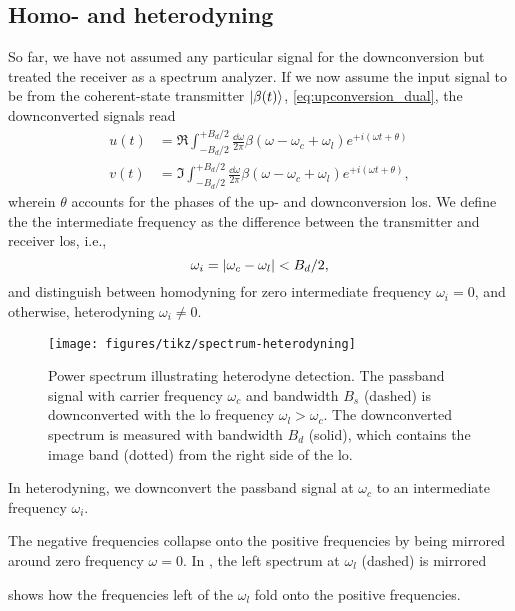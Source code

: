 \subsection{Homo- and heterodyning}

So far, we have not assumed any particular signal for the downconversion but treated the receiver as a spectrum analyzer.
If we now assume the input signal to be from the coherent-state transmitter $\lvert\beta(t)\rangle$, \cref{eq:upconversion_dual}, the downconverted signals read
\begin{align}
	u(t)
	&=
	\Re
	\int_{-B_d/2}^{+B_d/2}\frac{\dd{\omega}}{2\pi}
	\beta(\omega-\omega_c+\omega_l)
	e^{+i(\omega t+\theta)}
	\label{eq:receiver_demod_real}
	\\
	v(t)
	&=
	\Im
	\int_{-B_d/2}^{+B_d/2}\frac{\dd{\omega}}{2\pi}
	\beta(\omega-\omega_c+\omega_l)
	e^{+i(\omega t+\theta)}
	\label{eq:receiver_demod_imag}
	,
\end{align}
wherein $\theta$ accounts for the phases of the up- and downconversion \glspl{lo}.
We define the the intermediate frequency as the difference between the transmitter and receiver \glspl{lo}, i.e.,
\begin{equation}
	\omega_i
	=
	\lvert\omega_c-\omega_l\rvert
	<
	B_d/2
	,
\end{equation}
and distinguish between homodyning for zero intermediate frequency $\omega_i=0$, and otherwise, heterodyning $\omega_i\neq 0$.
\begin{figure}[htb]
	\centering
	\texttt{[image: figures/tikz/spectrum-heterodyning]}
	\caption{Power spectrum illustrating heterodyne detection. The passband signal with carrier frequency $\omega_c$ and bandwidth $B_s$ (dashed) is downconverted with the \gls{lo} frequency $\omega_l>\omega_c$. The downconverted spectrum is measured with bandwidth $B_d$ (solid), which contains the image band (dotted) from the right side of the \gls{lo}.}\label{fig:spectrum_heterodyning}
\end{figure}
In heterodyning, we downconvert the passband signal at $\omega_c$ to an intermediate frequency $\omega_i$.


The negative frequencies collapse onto the positive frequencies by being mirrored around zero frequency $\omega=0$.
In , the left spectrum at $\omega_l$ (dashed) is mirrored 

 shows how the frequencies left of the $\omega_l$ fold onto the positive frequencies.



